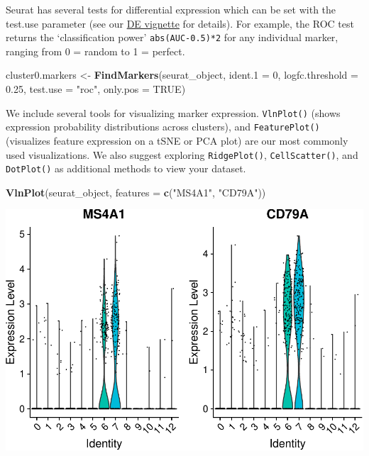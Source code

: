 \documentclass[
]{book}
\newenvironment{Shaded}{\begin{snugshade}}{\end{snugshade}}
\newcommand{\AttributeTok}[1]{\textcolor[rgb]{0.13,0.29,0.53}{#1}}
\newcommand{\ConstantTok}[1]{\textcolor[rgb]{0.56,0.35,0.01}{#1}}
\newcommand{\DecValTok}[1]{\textcolor[rgb]{0.00,0.00,0.81}{#1}}
\newcommand{\FloatTok}[1]{\textcolor[rgb]{0.00,0.00,0.81}{#1}}
\newcommand{\FunctionTok}[1]{\textcolor[rgb]{0.13,0.29,0.53}{\textbf{#1}}}
\newcommand{\NormalTok}[1]{#1}
\newcommand{\OtherTok}[1]{\textcolor[rgb]{0.56,0.35,0.01}{#1}}
\newcommand{\StringTok}[1]{\textcolor[rgb]{0.31,0.60,0.02}{#1}}
\begin{document}
Seurat has several tests for differential expression which can be set with the test.use parameter (see our \href{de_vignette.html}{DE vignette} for details). For example, the ROC test returns the `classification power' \texttt{abs(AUC-0.5)*2} for any individual marker, ranging from 0 = random to 1 = perfect.

\begin{Shaded}
\begin{Highlighting}[]
\NormalTok{cluster0.markers }\OtherTok{\textless{}{-}} \FunctionTok{FindMarkers}\NormalTok{(seurat\_object, }\AttributeTok{ident.1 =} \DecValTok{0}\NormalTok{, }\AttributeTok{logfc.threshold =} \FloatTok{0.25}\NormalTok{, }\AttributeTok{test.use =} \StringTok{"roc"}\NormalTok{, }\AttributeTok{only.pos =} \ConstantTok{TRUE}\NormalTok{)}
\end{Highlighting}
\end{Shaded}

We include several tools for visualizing marker expression. \texttt{VlnPlot()} (shows expression probability distributions across clusters), and \texttt{FeaturePlot()} (visualizes feature expression on a tSNE or PCA plot) are our most commonly used visualizations. We also suggest exploring \texttt{RidgePlot()}, \texttt{CellScatter()}, and \texttt{DotPlot()} as additional methods to view your dataset.

\begin{Shaded}
\begin{Highlighting}[]
\FunctionTok{VlnPlot}\NormalTok{(seurat\_object, }\AttributeTok{features =} \FunctionTok{c}\NormalTok{(}\StringTok{"MS4A1"}\NormalTok{, }\StringTok{"CD79A"}\NormalTok{))}
\end{Highlighting}
\end{Shaded}

\includegraphics{scRNAseqInR_ABACBS_2024_Doco_files/figure-latex/unnamed-chunk-25-1.pdf}
\end{document}
